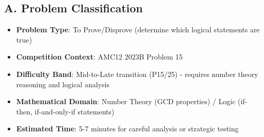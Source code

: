 \documentclass[12pt]{article}
\begin{document}
\begin{problemconfigbox}
\subsection*{A. Problem Classification}
\begin{itemize}[leftmargin=*]
    \item \textbf{Problem Type}: To Prove/Disprove (determine which logical statements are true)
    \item \textbf{Competition Context}: AMC12 2023B Problem 15
    \item \textbf{Difficulty Band}: Mid-to-Late transition (P15/25) - requires number theory reasoning and logical analysis
    \item \textbf{Mathematical Domain}: Number Theory (GCD properties) / Logic (if-then, if-and-only-if statements)
    \item \textbf{Estimated Time}: 5-7 minutes for careful analysis or strategic testing
\end{itemize}


\end{problemconfigbox}
\end{document}

